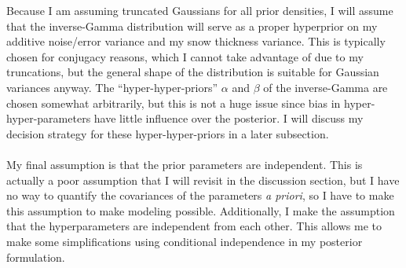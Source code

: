 \documentclass[12pt, letterpaper]{article}
\begin{document}
Because I am assuming truncated Gaussians for all prior densities, I will assume that the inverse-Gamma distribution will serve as a proper
hyperprior on my additive noise/error variance and my snow thickness variance. This is typically chosen for conjugacy reasons,
which I cannot take advantage of due to my truncations, but the general shape of the distribution is suitable for Gaussian variances anyway.
The ``hyper-hyper-priors'' $\alpha$ and  $\beta$ of the inverse-Gamma are chosen somewhat arbitrarily,
but this is not a huge issue since bias in hyper-hyper-parameters have little influence over the posterior. I will discuss my decision strategy
for these hyper-hyper-priors in a later subsection.
\\\\
My final assumption is that the prior parameters are independent. This is actually a poor assumption that I will revisit in the discussion section,
but I have no way to quantify the covariances of the parameters \emph{a priori}, so I have to make this assumption to make modeling possible.
Additionally, I make the assumption that the hyperparameters are independent from each other. This allows me to make some simplifications
using conditional independence in my posterior formulation.
\end{document}
